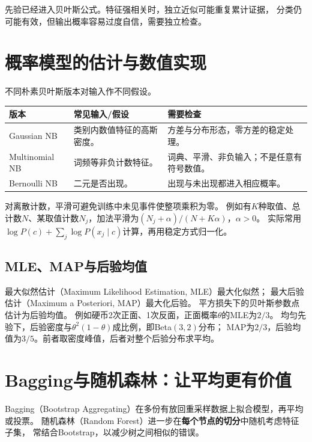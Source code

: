 \begin{pitfall}[不要在后验上再乘一次先验]
先验已经进入贝叶斯公式。特征强相关时，独立近似可能重复累计证据，
分类仍可能有效，但输出概率容易过度自信，需要独立检查。
\end{pitfall}

\section{概率模型的估计与数值实现}
\label{sec:tree-probability-estimation}
不同朴素贝叶斯版本对输入作不同假设。

\begin{center}
\begin{tabularx}{\textwidth}{P{31mm}P{45mm}Y}
\toprule
版本 & 常见输入/假设 & 需要检查\\
\midrule
Gaussian NB & 类别内数值特征的高斯密度。 & 方差与分布形态，零方差的稳定处理。\\
Multinomial NB & 词频等非负计数特征。 & 词典、平滑、非负输入；不是任意有符号数值。\\
Bernoulli NB & 二元是否出现。 & 出现与未出现都进入相应概率。\\
\bottomrule
\end{tabularx}
\end{center}

对离散计数，平滑可避免训练中未见事件使整项乘积为零。
例如有$K$种取值、总计数$N$、某取值计数$N_j$，加法平滑为$(N_j+\alpha)/(N+K\alpha)$，$\alpha>0$。
实际常用$\log P(c)+\sum_j\log P(x_j\mid c)$计算，再用稳定方式归一化。

\subsection{MLE、MAP与后验均值}
最大似然估计（Maximum Likelihood Estimation, MLE）最大化似然；
最大后验估计（Maximum a Posteriori, MAP）最大化后验。
平方损失下的贝叶斯参数点估计为后验均值。
例如硬币2次正面、1次反面，正面概率$\theta$的MLE为$2/3$。
均匀先验下，后验密度与$\theta^2(1-\theta)$成比例，即Beta$(3,2)$分布；
MAP为$2/3$，后验均值为$3/5$。前者取密度峰值，后者对整个后验分布求平均。


\section{Bagging与随机森林：让平均更有价值}
\label{sec:tree-bagging}
Bagging（Bootstrap Aggregating）在多份有放回重采样数据上拟合模型，再平均或投票。
随机森林（Random Forest）进一步在\textbf{每个节点的切分}中随机考虑特征子集，
常结合Bootstrap，以减少树之间相似的错误。

